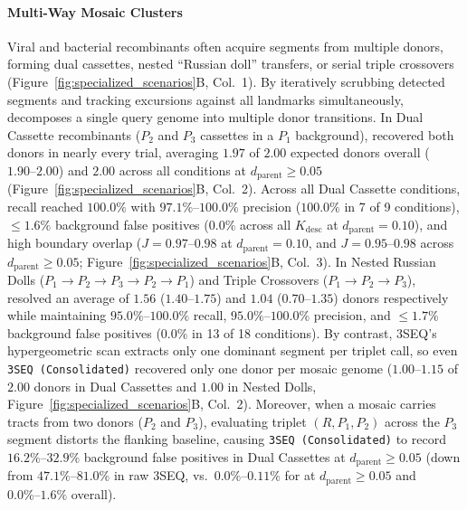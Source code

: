 \paragraph{Multi-Way Mosaic Clusters}
Viral and bacterial recombinants often acquire segments from multiple donors, forming dual cassettes, nested ``Russian doll'' transfers, or serial triple crossovers (Figure~\ref{fig:specialized_scenarios}B, Col.~1). By iteratively scrubbing detected segments and tracking excursions against all landmarks simultaneously, \RhizAeon decomposes a single query genome into multiple donor transitions. In Dual Cassette recombinants ($P_2$ and $P_3$ cassettes in a $P_1$ background), \RhizAeon recovered both donors in nearly every trial, averaging $1.97$ of $2.00$ expected donors overall ($1.90\text{--}2.00$) and $2.00$ across all conditions at $d_{\mathrm{parent}} \ge 0.05$ (Figure~\ref{fig:specialized_scenarios}B, Col.~2). Across all Dual Cassette conditions, recall reached $100.0\%$ with $97.1\%\text{--}100.0\%$ precision ($100.0\%$ in 7 of 9 conditions), $\le 1.6\%$ background false positives ($0.0\%$ across all $K_{\mathrm{desc}}$ at $d_{\mathrm{parent}} = 0.10$), and high boundary overlap ($J = 0.97\text{--}0.98$ at $d_{\mathrm{parent}} = 0.10$, and $J = 0.95\text{--}0.98$ across $d_{\mathrm{parent}} \ge 0.05$; Figure~\ref{fig:specialized_scenarios}B, Col.~3). In Nested Russian Dolls ($P_1 \to P_2 \to P_3 \to P_2 \to P_1$) and Triple Crossovers ($P_1 \to P_2 \to P_3$), \RhizAeon resolved an average of $1.56$ ($1.40\text{--}1.75$) and $1.04$ ($0.70\text{--}1.35$) donors respectively while maintaining $95.0\%\text{--}100.0\%$ recall, $95.0\%\text{--}100.0\%$ precision, and $\le 1.7\%$ background false positives ($0.0\%$ in 13 of 18 conditions). By contrast, 3SEQ's hypergeometric scan extracts only one dominant segment per triplet call, so even \texttt{3SEQ (Consolidated)} recovered only one donor per mosaic genome ($1.00\text{--}1.15$ of $2.00$ donors in Dual Cassettes and $1.00$ in Nested Dolls, Figure~\ref{fig:specialized_scenarios}B, Col.~2). Moreover, when a mosaic carries tracts from two donors ($P_2$ and $P_3$), evaluating triplet $(R, P_1, P_2)$ across the $P_3$ segment distorts the flanking baseline, causing \texttt{3SEQ (Consolidated)} to record $16.2\%\text{--}32.9\%$ background false positives in Dual Cassettes at $d_{\mathrm{parent}} \ge 0.05$ (down from $47.1\%\text{--}81.0\%$ in raw 3SEQ, vs.\ $0.0\%\text{--}0.11\%$ for \RhizAeon at $d_{\mathrm{parent}} \ge 0.05$ and $0.0\%\text{--}1.6\%$ overall).

